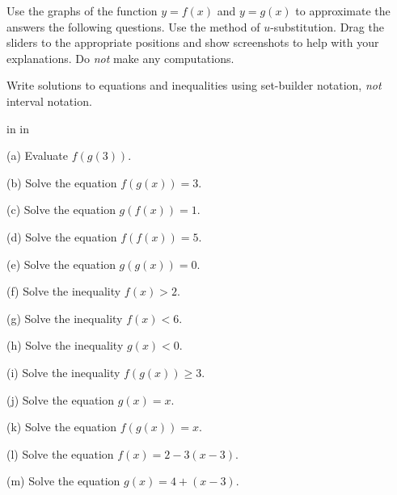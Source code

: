 \documentclass{ximera}
\newcommand{\pskip}{\vskip 0.1 in}
\begin{document}
\begin{question} \label{Ex:435rtggytt}
Use the graphs of the function $y=f(x)$ and $y=g(x)$ to approximate the answers the following questions. Use the method of $u$-substitution. Drag the sliders to the appropriate positions and show screenshots to help with your explanations. Do \emph{not} make any computations.

Write solutions to equations and inequalities using set-builder notation, \emph{not} interval notation.

\begin{onlineOnly}
    \begin{center}
\end{center}
\end{onlineOnly}


\pskip \pskip

(a) Evaluate $f(g(3))$.

(b) Solve the equation $f(g(x)) = 3$.

(c) Solve the equation $g(f(x))=1$.

(d) Solve the equation $f(f(x)) = 5$.

(e) Solve the equation $g(g(x)) = 0$.

(f) Solve the inequality $f(x)>2$.

(g) Solve the inequality $f(x)<6$.

(h) Solve the inequality $g(x)<0$.

(i) Solve the inequality $f(g(x))\geq 3$.

(j) Solve the equation $g(x)=x$.

(k) Solve the equation $f(g(x))=x$.

(l) Solve the equation $f(x)=2 - 3(x-3)$.

(m) Solve the equation $g(x) = 4+(x-3)$.


\end{question}
\end{document}
